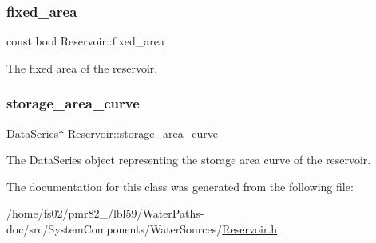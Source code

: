 \subsubsection{\texorpdfstring{fixed\+\_\+area}{fixed\_area}}
{\footnotesize\ttfamily const bool Reservoir\+::fixed\+\_\+area}



The fixed area of the reservoir. 

\mbox{\label{classReservoir_a46bd5b750963dfa9a57b247fd77ab8ff}} 
\subsubsection{\texorpdfstring{storage\+\_\+area\+\_\+curve}{storage\_area\_curve}}
{\footnotesize\ttfamily Data\+Series$\ast$ Reservoir\+::storage\+\_\+area\+\_\+curve\hspace{0.3cm}{\ttfamily [protected]}}



The Data\+Series object representing the storage area curve of the reservoir. 



The documentation for this class was generated from the following file\+:\begin{DoxyCompactItemize}
\item 
/home/fs02/pmr82\+\_/lbl59/\+Water\+Paths-\/doc/src/\+System\+Components/\+Water\+Sources/\mbox{\hyperlink{Reservoir_8h}{Reservoir.\+h}}\end{DoxyCompactItemize}
